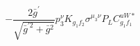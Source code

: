 %
\begin{dmath*}
%
  -  \frac{2 {\bar g}^\prime}{\sqrt{{\bar g}^{\prime 2} + {\bar g}{}^2}} p_3^{\nu} K_{g_1 f_2} \sigma^{\mu_3 \nu } P_L  C^{uW*}_{g_1 f_1}
%
\end{dmath*}
%
